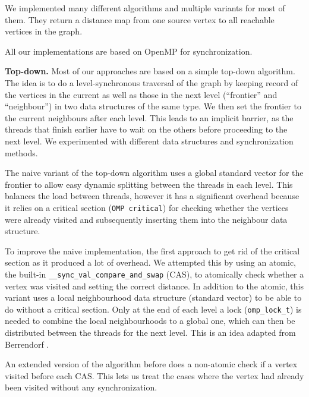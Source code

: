 \documentclass[letterpaper]{article}
\newcommand{\mypar}[1]{{\bf #1.}} %
\begin{document}
		We implemented many different algorithms and multiple variants for most of them. They return a distance map from one source vertex to all reachable vertices in the graph.
		
		All our implementations are based on OpenMP for synchronization.
		
		\mypar{Top-down}
		Most of our approaches are based on a simple top-down algorithm. 
		The idea is to do a level-synchronous traversal of the graph by keeping record of the vertices in the current as well as those in the next level (``frontier'' and ``neighbour'') in two data structures of the same type. 
		We then set the frontier to the current neighbours after each level. 
		This leads to an implicit barrier, as the threads that finish earlier have to wait on the others before proceeding to the next level.
		We experimented with different data structures and synchronization methods.
		
		The naive variant of the top-down algorithm uses a global standard vector for the frontier to allow easy dynamic splitting between the threads in each level. 
		This balances the load between threads, however it has a significant overhead because it relies on a critical section (\verb+OMP critical+) for checking whether the vertices were already visited and subsequently inserting them into the neighbour data structure.
		
		To improve the naive implementation, the first approach to get rid of the critical section as it produced a lot of overhead. 
		We attempted this by using an atomic, the built-in \verb+__sync_val_compare_and_swap+ (CAS), to atomically check whether a vertex was visited and setting the correct distance. 
		In addition to the atomic, this variant uses a local neighbourhood data structure (standard vector) to be able to do without a critical section. 
		Only at the end of each level a lock (\verb+omp_lock_t+) is needed to combine the local neighbourhoods to a global one, which can then be distributed between the threads for the next level. 
		This is an idea adapted from Berrendorf \cite{Berrendorf:14}.
		
		An extended version of the algorithm before does a non-atomic check if a vertex visited before each CAS. 
		This lets us treat the cases where the vertex had already been visited without any synchronization.
		
\end{document}

